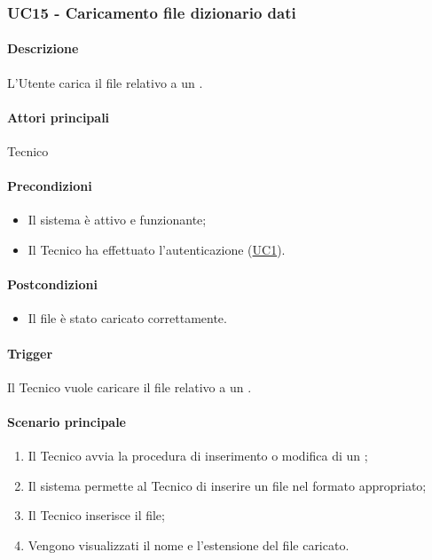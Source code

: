 \subsubsection{UC15 - Caricamento file dizionario dati}\label{UC15}

\paragraph*{Descrizione}
L'Utente carica il file relativo a un .

\paragraph*{Attori principali}
Tecnico

\paragraph*{Precondizioni}
\begin{itemize}
  \item Il sistema è attivo e funzionante;
  \item Il Tecnico ha effettuato l'autenticazione (\hyperref[UC1]{UC1}).
\end{itemize}

\paragraph*{Postcondizioni}
\begin{itemize}
  \item Il file è stato caricato correttamente.
\end{itemize}

\paragraph*{Trigger}
Il Tecnico vuole caricare il file relativo a un .

\paragraph*{Scenario principale}
\begin{enumerate}
  \item Il Tecnico avvia la procedura di inserimento o modifica di un ;
  \item Il sistema permette al Tecnico di inserire un file nel formato appropriato;
  \item Il Tecnico inserisce il file;
  \item Vengono visualizzati il nome e l'estensione del file caricato.
\end{enumerate}
